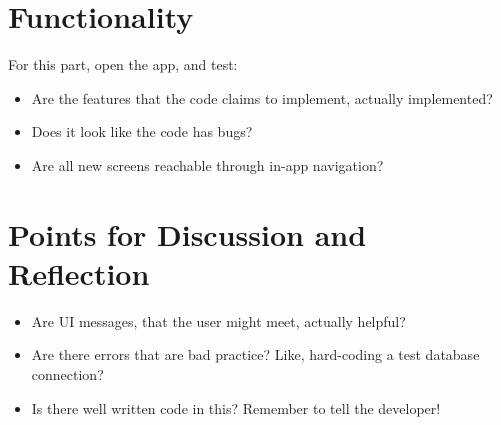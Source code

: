 \section{Functionality}
For this part, open the app, and test:

\begin{itemize}
\item Are the features that the code claims to implement, actually
 implemented?
\item Does it look like the code has bugs?
\item Are all new screens reachable through in-app navigation?
\end{itemize}

\section{Points for Discussion and Reflection}
\begin{itemize}
\item Are UI messages, that the user might meet, actually helpful?
\item Are there errors that are bad practice? Like, hard-coding a
 test database connection?
\item Is there well written code in this? Remember to tell the
 developer!
\end{itemize}
